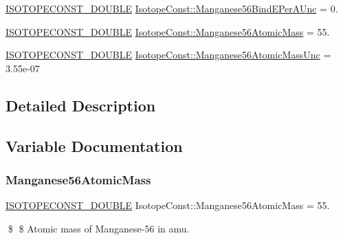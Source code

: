 \begin{DoxyCompactItemize}
\mbox{\hyperlink{group___isotope_const-_macros_ga8f45a7272ce02c0b4c65c44636ed719a}{I\+S\+O\+T\+O\+P\+E\+C\+O\+N\+S\+T\+\_\+\+D\+O\+U\+B\+LE}} \mbox{\hyperlink{group___isotope_const-_manganese-_mn56_ga15dc5e622427024bb09ae6501137212c}{Isotope\+Const\+::\+Manganese56\+Bind\+E\+Per\+A\+Unc}} = 0.
\item 
\mbox{\hyperlink{group___isotope_const-_macros_ga8f45a7272ce02c0b4c65c44636ed719a}{I\+S\+O\+T\+O\+P\+E\+C\+O\+N\+S\+T\+\_\+\+D\+O\+U\+B\+LE}} \mbox{\hyperlink{group___isotope_const-_manganese-_mn56_gabf747ad2cfaf0f35ef1cf1bdd2342772}{Isotope\+Const\+::\+Manganese56\+Atomic\+Mass}} = 55.
\item 
\mbox{\hyperlink{group___isotope_const-_macros_ga8f45a7272ce02c0b4c65c44636ed719a}{I\+S\+O\+T\+O\+P\+E\+C\+O\+N\+S\+T\+\_\+\+D\+O\+U\+B\+LE}} \mbox{\hyperlink{group___isotope_const-_manganese-_mn56_gac966ba0efb2170d5f6768bcb418b6964}{Isotope\+Const\+::\+Manganese56\+Atomic\+Mass\+Unc}} = 3.\+55e-\/07
\end{DoxyCompactItemize}


\subsection{Detailed Description}


\subsection{Variable Documentation}
\mbox{\label{group___isotope_const-_manganese-_mn56_gabf747ad2cfaf0f35ef1cf1bdd2342772}} 
\subsubsection{\texorpdfstring{Manganese56\+Atomic\+Mass}{Manganese56AtomicMass}}
{\footnotesize\ttfamily \mbox{\hyperlink{group___isotope_const-_macros_ga8f45a7272ce02c0b4c65c44636ed719a}{I\+S\+O\+T\+O\+P\+E\+C\+O\+N\+S\+T\+\_\+\+D\+O\+U\+B\+LE}} Isotope\+Const\+::\+Manganese56\+Atomic\+Mass = 55.}

\$ \$ Atomic mass of Manganese-\/56 in amu. \mbox{\label{group___isotope_const-_manganese-_mn56_gac966ba0efb2170d5f6768bcb418b6964}} 
